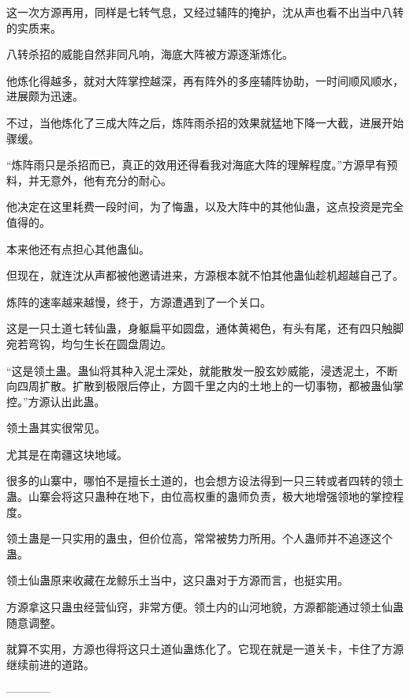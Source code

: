 \begin{this_body}
这一次方源再用，同样是七转气息，又经过辅阵的掩护，沈从声也看不出当中八转的实质来。

八转杀招的威能自然非同凡响，海底大阵被方源逐渐炼化。

他炼化得越多，就对大阵掌控越深，再有阵外的多座辅阵协助，一时间顺风顺水，进展颇为迅速。

不过，当他炼化了三成大阵之后，炼阵雨杀招的效果就猛地下降一大截，进展开始骤缓。

“炼阵雨只是杀招而已，真正的效用还得看我对海底大阵的理解程度。”方源早有预料，并无意外，他有充分的耐心。

他决定在这里耗费一段时间，为了悔蛊，以及大阵中的其他仙蛊，这点投资是完全值得的。

本来他还有点担心其他蛊仙。

但现在，就连沈从声都被他邀请进来，方源根本就不怕其他蛊仙趁机超越自己了。

炼阵的速率越来越慢，终于，方源遭遇到了一个关口。

这是一只土道七转仙蛊，身躯扁平如圆盘，通体黄褐色，有头有尾，还有四只触脚宛若弯钩，均匀生长在圆盘周边。

“这是领土蛊。蛊仙将其种入泥土深处，就能散发一股玄妙威能，浸透泥土，不断向四周扩散。扩散到极限后停止，方圆千里之内的土地上的一切事物，都被蛊仙掌控。”方源认出此蛊。

领土蛊其实很常见。

尤其是在南疆这块地域。

很多的山寨中，哪怕不是擅长土道的，也会想方设法得到一只三转或者四转的领土蛊。山寨会将这只蛊种在地下，由位高权重的蛊师负责，极大地增强领地的掌控程度。

领土蛊是一只实用的蛊虫，但价位高，常常被势力所用。个人蛊师并不追逐这个蛊。

领土仙蛊原来收藏在龙鲸乐土当中，这只蛊对于方源而言，也挺实用。

方源拿这只蛊虫经营仙窍，非常方便。领土内的山河地貌，方源都能通过领土仙蛊随意调整。

就算不实用，方源也得将这只土道仙蛊炼化了。它现在就是一道关卡，卡住了方源继续前进的道路。

------------

\end{this_body}

